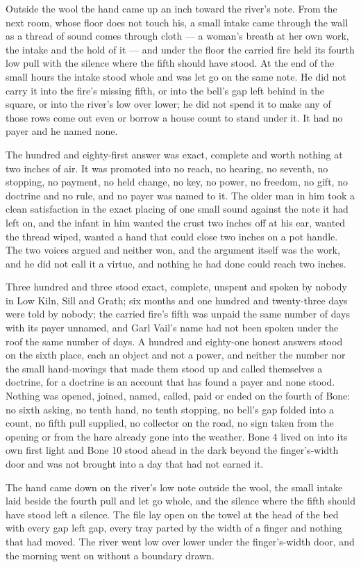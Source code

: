 \scenebreak

Outside the wool the hand came up an inch toward the river's note. From the next room, whose floor does not touch his, a small intake came through the wall as a thread of sound comes through cloth --- a woman's breath at her own work, the intake and the hold of it --- and under the floor the carried fire held its fourth low pull with the silence where the fifth should have stood. At the end of the small hours the intake stood whole and was let go on the same note. He did not carry it into the fire's missing fifth, or into the bell's gap left behind in the square, or into the river's low over lower; he did not spend it to make any of those rows come out even or borrow a house count to stand under it. It had no payer and he named none.

The hundred and eighty-first answer was exact, complete and worth nothing at two inches of air. It was promoted into no reach, no hearing, no seventh, no stopping, no payment, no held change, no key, no power, no freedom, no gift, no doctrine and no rule, and no payer was named to it. The older man in him took a clean satisfaction in the exact placing of one small sound against the note it had left on, and the infant in him wanted the crust two inches off at his ear, wanted the thread wiped, wanted a hand that could close two inches on a pot handle. The two voices argued and neither won, and the argument itself was the work, and he did not call it a virtue, and nothing he had done could reach two inches.

Three hundred and three stood exact, complete, unspent and spoken by nobody in Low Kiln, Sill and Grath; six months and one hundred and twenty-three days were told by nobody; the carried fire's fifth was unpaid the same number of days with its payer unnamed, and Garl Vail's name had not been spoken under the roof the same number of days. A hundred and eighty-one honest answers stood on the sixth place, each an object and not a power, and neither the number nor the small hand-movings that made them stood up and called themselves a doctrine, for a doctrine is an account that has found a payer and none stood. Nothing was opened, joined, named, called, paid or ended on the fourth of Bone: no sixth asking, no tenth hand, no tenth stopping, no bell's gap folded into a count, no fifth pull supplied, no collector on the road, no sign taken from the opening or from the hare already gone into the weather. Bone 4 lived on into its own first light and Bone 10 stood ahead in the dark beyond the finger's-width door and was not brought into a day that had not earned it.

The hand came down on the river's low note outside the wool, the small intake laid beside the fourth pull and let go whole, and the silence where the fifth should have stood left a silence. The file lay open on the towel at the head of the bed with every gap left gap, every tray parted by the width of a finger and nothing that had moved. The river went low over lower under the finger's-width door, and the morning went on without a boundary drawn.
